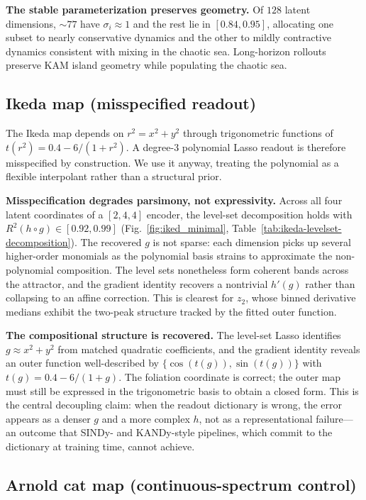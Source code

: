 \documentclass{article}
\begin{document}
\textbf{The stable parameterization preserves geometry.} Of $128$ latent
dimensions, $\sim 77$ have $\sigma_i\approx 1$ and the rest lie in $[0.84,
0.95]$, allocating one subset to nearly conservative dynamics and the other
to mildly contractive dynamics consistent with mixing in the chaotic sea.
Long-horizon rollouts preserve KAM island geometry while populating the
chaotic sea.


\subsection*{Ikeda map (misspecified readout)}

The Ikeda map depends on $r^2 = x^2+y^2$ through trigonometric functions of
$t(r^2) = 0.4 - 6/(1+r^2)$. A degree-3 polynomial Lasso readout is therefore
misspecified by construction. We use it anyway, treating the polynomial as a
flexible interpolant rather than a structural prior.

\textbf{Misspecification degrades parsimony, not expressivity.} Across all four
latent coordinates of a $[2,4,4]$ encoder, the level-set decomposition holds
with $R^2(h\circ g) \in [0.92, 0.99]$ (Fig.~\ref{fig:iked_minimal},
Table~\ref{tab:ikeda-levelset-decomposition}). The recovered $g$ is not sparse:
each dimension picks up several higher-order monomials as the polynomial basis
strains to approximate the non-polynomial composition. The level sets
nonetheless form coherent bands across the attractor, and the gradient identity
recovers a nontrivial $h'(g)$ rather than collapsing to an affine correction.
This is clearest for $z_2$, whose binned derivative medians exhibit the
two-peak structure tracked by the fitted outer function.

\textbf{The compositional structure is recovered.} The level-set Lasso identifies $g \approx x^2+y^2$ from matched quadratic coefficients, and the gradient identity reveals an outer function well-described by $\{\cos(t(g)),\sin(t(g))\}$ with $t(g) = 0.4 - 6/(1+g)$. The foliation coordinate is correct; the outer map must still be expressed in the trigonometric basis to obtain a closed form. This is the central decoupling claim: when the readout dictionary is wrong, the error appears as a denser $g$ and a more complex $h$, not as a representational failure---an outcome that SINDy- and KANDy-style pipelines, which commit to the dictionary at training time, cannot achieve.


\subsection*{Arnold cat map (continuous-spectrum control)}
\end{document}
